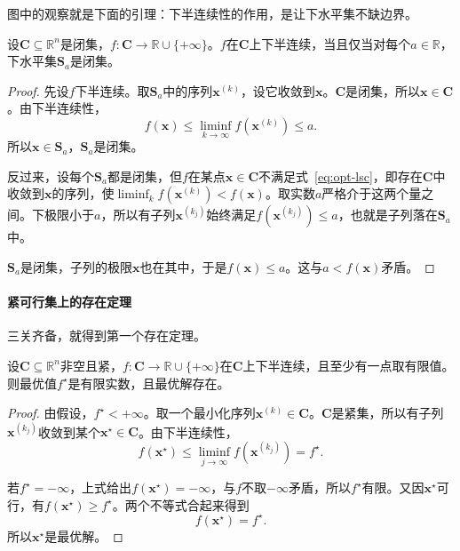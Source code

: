 图中的观察就是下面的引理：下半连续性的作用，是让下水平集不缺边界。

\begin{lemma}[下半连续与闭下水平集]
\label{lem:opt-lsc-sublevel}
设$\bm{C}\subseteq\mathbb{R}^n$是闭集，$f:\bm{C}\to\mathbb{R}\cup\{+\infty\}$。$f$在$\bm{C}$上下半连续，当且仅当对每个$a\in\mathbb{R}$，下水平集$\bm{S}_a$是闭集。
\end{lemma}

\begin{proof}
先设$f$下半连续。取$\bm{S}_a$中的序列$\bm{x}^{(k)}$，设它收敛到$\bm{x}$。$\bm{C}$是闭集，所以$\bm{x}\in\bm{C}$。由下半连续性，
\[
 f(\bm{x})\leq\liminf_{k\to\infty}f(\bm{x}^{(k)})\leq a.
\]
所以$\bm{x}\in\bm{S}_a$，$\bm{S}_a$是闭集。

反过来，设每个$\bm{S}_a$都是闭集，但$f$在某点$\bm{x}\in\bm{C}$不满足式~\eqref{eq:opt-lsc}，即存在$\bm{C}$中收敛到$\bm{x}$的序列，使$\liminf_kf(\bm{x}^{(k)})<f(\bm{x})$。取实数$a$严格介于这两个量之间。下极限小于$a$，所以有子列$\bm{x}^{(k_j)}$始终满足$f(\bm{x}^{(k_j)})\leq a$，也就是子列落在$\bm{S}_a$中。

$\bm{S}_a$是闭集，子列的极限$\bm{x}$也在其中，于是$f(\bm{x})\leq a$。这与$a<f(\bm{x})$矛盾。
\end{proof}

\paragraph{紧可行集上的存在定理}
三关齐备，就得到第一个存在定理。

\begin{theorem}[紧可行集上的最小值]
\label{thm:opt-compact-existence}
设$\bm{C}\subseteq\mathbb{R}^n$非空且紧，$f:\bm{C}\to\mathbb{R}\cup\{+\infty\}$在$\bm{C}$上下半连续，且至少有一点取有限值。则最优值$f^\star$是有限实数，且最优解存在。
\end{theorem}

\begin{proof}
由假设，$f^\star<+\infty$。取一个最小化序列$\bm{x}^{(k)}\in\bm{C}$。$\bm{C}$是紧集，所以有子列$\bm{x}^{(k_j)}$收敛到某个$\bm{x}^\star\in\bm{C}$。由下半连续性，
\[
 f(\bm{x}^\star)\leq\liminf_{j\to\infty}f(\bm{x}^{(k_j)})=f^\star.
\]

若$f^\star=-\infty$，上式给出$f(\bm{x}^\star)=-\infty$，与$f$不取$-\infty$矛盾，所以$f^\star$有限。又因$\bm{x}^\star$可行，有$f(\bm{x}^\star)\geq f^\star$。两个不等式合起来得到
\[
 f(\bm{x}^\star)=f^\star.
\]
所以$\bm{x}^\star$是最优解。
\end{proof}

